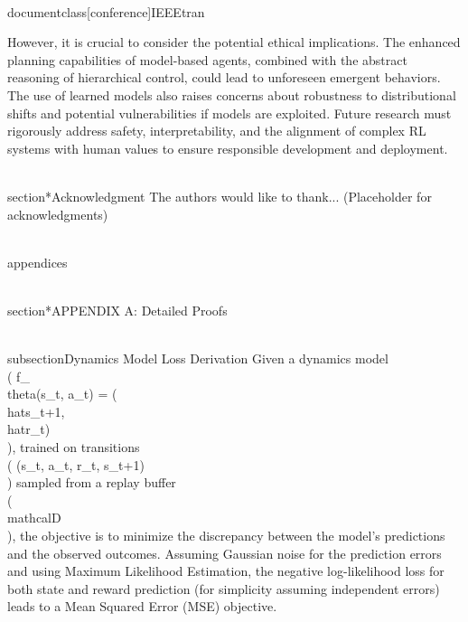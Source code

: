 \\documentclass[conference]{IEEEtran}
\begin{document}
However, it is crucial to consider the potential ethical implications. The enhanced planning capabilities of model-based agents, combined with the abstract reasoning of hierarchical control, could lead to unforeseen emergent behaviors. The use of learned models also raises concerns about robustness to distributional shifts and potential vulnerabilities if models are exploited. Future research must rigorously address safety, interpretability, and the alignment of complex RL systems with human values to ensure responsible development and deployment.

\\section*{Acknowledgment}
The authors would like to thank... (Placeholder for acknowledgments)

\\appendices

\\section*{APPENDIX A: Detailed Proofs}

\\subsection{Dynamics Model Loss Derivation}
Given a dynamics model \\( f_\\theta(s_t, a_t) = (\\hat{s}_{t+1}, \\hat{r}_t) \\), trained on transitions \\( (s_t, a_t, r_t, s_{t+1}) \\) sampled from a replay buffer \\( \\mathcal{D} \\), the objective is to minimize the discrepancy between the model's predictions and the observed outcomes. Assuming Gaussian noise for the prediction errors and using Maximum Likelihood Estimation, the negative log-likelihood loss for both state and reward prediction (for simplicity assuming independent errors) leads to a Mean Squared Error (MSE) objective.
\end{document}
